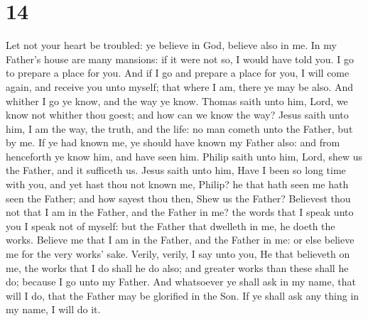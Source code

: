\hypertarget{section-13}{%
\section{14}\label{section-13}}

 Let not your heart be troubled: ye believe in God,
believe also in me.  In my Father's house are many
mansions: if it were not so, I would have told you. I go to prepare a
place for you.  And if I go and prepare a place for you, I
will come again, and receive you unto myself; that where I am, there ye
may be also.  And whither I go ye know, and the way ye
know.  Thomas saith unto him, Lord, we know not whither
thou goest; and how can we know the way?  Jesus saith unto
him, I am the way, the truth, and the life: no man cometh unto the
Father, but by me.  If ye had known me, ye should have
known my Father also: and from henceforth ye know him, and have seen
him.  Philip saith unto him, Lord, shew us the Father, and
it sufficeth us.  Jesus saith unto him, Have I been so
long time with you, and yet hast thou not known me, Philip? he that hath
seen me hath seen the Father; and how sayest thou then, Shew us the
Father?  Believest thou not that I am in the Father, and
the Father in me? the words that I speak unto you I speak not of myself:
but the Father that dwelleth in me, he doeth the works. 
Believe me that I am in the Father, and the Father in me: or else
believe me for the very works' sake.  Verily, verily, I
say unto you, He that believeth on me, the works that I do shall he do
also; and greater works than these shall he do; because I go unto my
Father.  And whatsoever ye shall ask in my name, that
will I do, that the Father may be glorified in the Son. 
If ye shall ask any thing in my name, I will do it.

